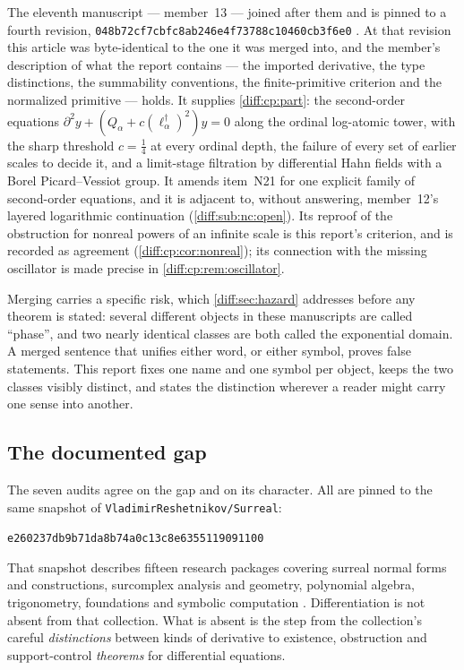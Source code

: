 \documentclass[11pt,letterpaper]{article}
\numberwithin{equation}{section}
\theoremstyle{definition}
\theoremstyle{remark}
\newcommand{\der}{\partial}
\newcommand{\Repo}{\texttt{VladimirReshetnikov/Surreal}}
\newcommand{\Commit}{\nolinkurl{e260237db9b71da8b74a0c13c8e6355119091100}}
\newcommand{\CommitD}{\nolinkurl{048b72cf7cbfc8ab246e4f73788c10460cb3f6e0}}
\begin{document}
The eleventh manuscript --- member~13 --- joined after them and is pinned to a
fourth revision, \CommitD{} \cite{RepoSnapshotD}. At that revision this article
was byte-identical to the one it was merged into, and the member's description
of what the report contains --- the imported derivative, the type
distinctions, the summability conventions, the finite-primitive criterion and
the normalized primitive --- holds. It supplies \cref{diff:cp:part}: the
second-order equations $\der^{2}y+(Q_{\alpha}+c(\ell_{\alpha}^{\dagger})^{2})y=0$
along the ordinal log-atomic tower, with the sharp threshold $c=\frac14$ at
every ordinal depth, the failure of every set of earlier scales to decide it,
and a limit-stage filtration by differential Hahn fields with a Borel
Picard--Vessiot group. It amends item~N21 for one explicit family of
second-order equations, and it is adjacent to, without answering, member~12's
layered logarithmic continuation (\cref{diff:sub:nc:open}). Its reproof of the
obstruction for nonreal powers of an infinite scale is this report's criterion,
and is recorded as agreement (\cref{diff:cp:cor:nonreal}); its connection with
the missing oscillator is made precise in \cref{diff:cp:rem:oscillator}.

Merging carries a specific risk, which \cref{diff:sec:hazard} addresses before
any theorem is stated: several different objects in these manuscripts are
called ``phase'', and two nearly identical classes are both called the
exponential domain. A merged sentence that unifies either word, or either
symbol, proves false statements. This report fixes one name and one symbol per
object, keeps the two classes visibly distinct, and states the distinction
wherever a reader might carry one sense into another.

\subsection{The documented gap}
\label{diff:sub:gap}

The seven audits agree on the gap and on its character. All are pinned to the
same snapshot of \Repo:
\begin{center}\small\Commit\end{center}
That snapshot describes fifteen research packages covering surreal normal
forms and constructions, surcomplex analysis and geometry, polynomial algebra,
trigonometry, foundations and symbolic computation \cite{RepoMap}.
Differentiation is not absent from that collection. What is absent is the step from the collection's careful
\emph{distinctions} between kinds of derivative to existence, obstruction and
support-control \emph{theorems} for differential equations.
\end{document}
